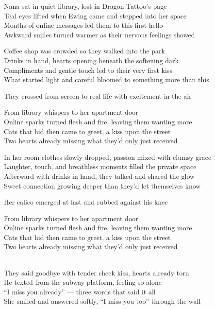 \begin{lyrics}
Nana sat in quiet library, lost in Dragon Tattoo’s page\\  
Teal eyes lifted when Ewing came and stepped into her space\\  
Months of online messages led them to this first hello\\  
Awkward smiles turned warmer as their nervous feelings showed  

Coffee shop was crowded so they walked into the park\\  
Drinks in hand, hearts opening beneath the softening dark\\  
Compliments and gentle touch led to their very first kiss\\  
What started light and careful bloomed to something more than this  

They crossed from screen to real life with excitement in the air  

From library whispers to her apartment door\\  
Online sparks turned flesh and fire, leaving them wanting more\\  
Cats that hid then came to greet, a kiss upon the street\\  
Two hearts already missing what they’d only just received  

In her room clothes slowly dropped, passion mixed with clumsy grace\\  
Laughter, touch, and breathless moments filled the private space\\  
Afterward with drinks in hand, they talked and shared the glow\\  
Sweet connection growing deeper than they’d let themselves know  

Her calico emerged at last and rubbed against his knee  

From library whispers to her apartment door\\  
Online sparks turned flesh and fire, leaving them wanting more\\  
Cats that hid then came to greet, a kiss upon the street\\  
Two hearts already missing what they’d only just received  

\\
They said goodbye with tender cheek kiss, hearts already torn\\  
He texted from the subway platform, feeling so alone\\  
“I miss you already” — three words that said it all\\  
She smiled and answered softly, “I miss you too” through the wall  


\end{lyrics}
